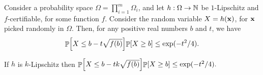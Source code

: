 \begin{theorem}
    Consider a probability space $\Omega =\prod_{i=1}^m \Omega_i$, and
    let $h:\Omega \rightarrow \mathbb{N}$ be $1$-Lipschitz and
    $f$-certifiable, for some function $f$. Consider the random
    variable $X= h(\mathbf{x})$, for $\mathbf{x}$ picked randomly in
    $\Omega$. Then, for any positive real numbers $b$ and $t$, we have
    \begin{equation*}
        \Prob{ X \leq b- t\sqrt{f(b)}}%
        \!\Prob{X \geq b} \leq \exp(-t^2/4).
    \end{equation*}

    If $h$ is $k$-Lipschitz then 
    \begin{math}
        \Prob{ X \leq b- tk\sqrt{f(b)}}%
        \!\Prob{X \geq b} \leq \exp(-t^2/4).
    \end{math}
\end{theorem}
